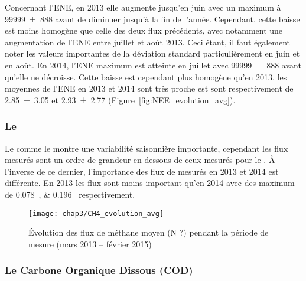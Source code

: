 
Concernant l'ENE, en 2013 elle augmente jusqu'en juin avec un maximum à \SI{99999(888)}{\uml} avant de diminuer jusqu'à la fin de l'année.
Cependant, cette baisse est moins homogène que celle des deux flux précédents, avec notamment une augmentation de l'ENE entre juillet et août 2013.
Ceci étant, il faut également noter les valeurs importantes de la déviation standard particulièrement en juin et en août.
En 2014, l'ENE maximum est atteinte en juillet avec \SI{99999(888)}{\uml} avant qu'elle ne décroisse.
Cette baisse est cependant plus homogène qu'en 2013.
les moyennes de l'ENE en 2013 et 2014 sont très proche est sont respectivement de \SI{2.85(305)}{\uml} et \SI{2.93(277)}{\uml} (Figure~\ref{fig:NEE_evolution_avg}).

\subsubsection{Le \chh}

Le \chh comme le \coo montre une variabilité saisonnière importante, cependant les flux mesurés sont un ordre de grandeur en dessous de ceux mesurés pour le \coo.
À l'inverse de ce dernier, l'importance des flux de \chh mesurés en 2013 et 2014 est différente.
En 2013 les flux sont moins important qu'en 2014 avec des maximum de \SIlist{0.078;0.196}{\uml} respectivement.


\begin{figure}
\centering
\texttt{[image: chap3/CH4\_evolution\_avg]}
\caption{Évolution des flux de méthane moyen (N ?) pendant la période de mesure (mars 2013 -- février 2015)}
\label{fig:CH4_evolution_avg}
\end{figure}

\subsubsection{Le Carbone Organique Dissous (COD)}

